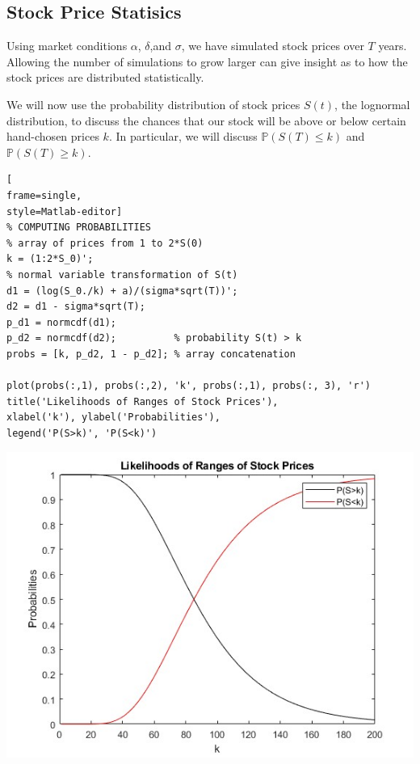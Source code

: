 \documentclass[letterpaper,12pt]{article}
\begin{document}
\subsection*{Stock Price Statisics}
Using market conditions $\alpha$, $\delta$,and $\sigma$, we have simulated stock prices over $T$ years. Allowing the number of simulations to grow larger can give insight as to how the stock prices are distributed statistically.

We will now use the probability distribution of stock prices $S(t)$, the lognormal 
distribution, to discuss the chances that our stock will be above or below certain 
hand-chosen prices $k$. In particular, we will discuss $\mathbb{P} (S(T) \leq k)$ and $\mathbb{P} (S(T) \geq k)$. \\

\begin{lstlisting}[
frame=single,
style=Matlab-editor]
% COMPUTING PROBABILITIES
% array of prices from 1 to 2*S(0)
k = (1:2*S_0)';
% normal variable transformation of S(t)
d1 = (log(S_0./k) + a)/(sigma*sqrt(T))';
d2 = d1 - sigma*sqrt(T);
p_d1 = normcdf(d1);
p_d2 = normcdf(d2);          % probability S(t) > k
probs = [k, p_d2, 1 - p_d2]; % array concatenation

plot(probs(:,1), probs(:,2), 'k', probs(:,1), probs(:, 3), 'r')
title('Likelihoods of Ranges of Stock Prices'),
xlabel('k'), ylabel('Probabilities'), 
legend('P(S>k)', 'P(S<k)')
\end{lstlisting}
\includegraphics[scale=0.725]{likelihoods}

\pagebreak
\end{document}
